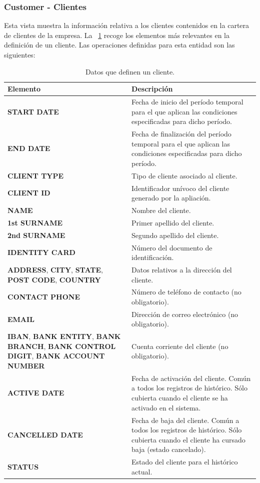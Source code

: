 \subsubsection{Customer - Clientes}
\label{sub:customer}

Esta vista muestra la información relativa a los clientes contenidos en la cartera de clientes de la empresa. La \tablename~\ref{tab:cliente} recoge los elementos más relevantes en la definición de un cliente.
Las operaciones definidas para esta entidad son las siguientes:

\begin{table}
  \centering
  \setlength{\leftmargini}{0.4cm}
  \resizebox{14cm}{!} {
  \begin{tabular}{|m{6cm} m{8cm}|}
  \rowcolor{udcpink!25}
  \hline
  	\textbf{Elemento} & \textbf{Descripción} \\\hline
  	\textbf{START DATE} & Fecha de inicio del período temporal para el que aplican las condiciones especificadas para dicho período.\\
  	\textbf{END DATE} & Fecha de finalización del período temporal para el que aplican las condiciones especificadas para dicho período.\\
	\textbf{CLIENT TYPE} & Tipo de cliente asociado al cliente.\\
	\textbf{CLIENT ID} & Identificador unívoco del cliente generado por la apliación.\\
	\textbf{NAME} & Nombre del cliente.\\
	\textbf{1st SURNAME} & Primer apellido del cliente.\\
	\textbf{2nd SURNAME} & Segundo apellido del cliente.\\
	\textbf{IDENTITY CARD} & Número del documento de identificación.\\	
	\textbf{ADDRESS}, \textbf{CITY}, \textbf{STATE}, \textbf{POST CODE}, \textbf{COUNTRY}  & Datos relativos a la dirección del cliente.\\	
	\textbf{CONTACT PHONE} & Número de teléfono de contacto (no obligatorio).\\
	\textbf{EMAIL} & Dirección de correo electrónico (no obligatorio).\\
	\textbf{IBAN}, \textbf{BANK ENTITY}, \textbf{BANK BRANCH}, \textbf{BANK CONTROL DIGIT}, \textbf{BANK ACCOUNT NUMBER} & Cuenta corriente del cliente (no obligatorio).\\
	\textbf{ACTIVE DATE} & Fecha de activación del cliente. Común a todos los registros de histórico. Sólo cubierta cuando el cliente se ha activado en el sistema.\\
	\textbf{CANCELLED DATE} & Fecha de baja del cliente. Común a todos los registros de histórico. Sólo cubierta cuando el cliente ha cursado baja (estado cancelado).\\	
	\textbf{STATUS} & Estado del cliente para el histórico actual.	
	\\\hline
  \end{tabular}
  } %
  \caption{Datos que definen un cliente.}
  \label{tab:cliente}
\end{table}

